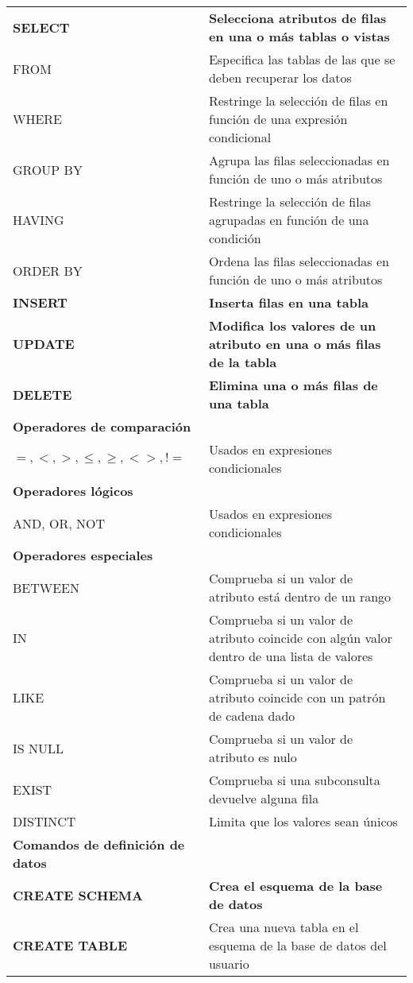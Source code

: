\begin{longtable}[l]{ l p{7cm} }
    \textbf{SELECT} & \textbf{Selecciona atributos de filas en una o más tablas o vistas}\\
    \qquad FROM  & Especifica las tablas de las que se deben recuperar los datos\\
    \qquad WHERE  & Restringe la selección de filas en función de una expresión condicional\\
    \qquad GROUP BY & Agrupa las filas seleccionadas en función de uno o más atributos\\
    \qquad HAVING & Restringe la selección de filas agrupadas en función de una condición\\
    \qquad ORDER BY & Ordena las filas seleccionadas en función de uno o más atributos\\
     \textbf{INSERT} & \textbf{Inserta filas en una tabla}\\
     \textbf{UPDATE} & \textbf{Modifica los valores de un atributo en una o más filas de la tabla}\\
    \textbf{DELETE} & \textbf{Elimina una o más filas de una tabla}\\
    \textbf{Operadores de comparación} \\
    \qquad $=,<,>,\leq,\geq,<>,!=$ & Usados en expresiones condicionales\\
    \textbf{Operadores lógicos} \\
    \qquad AND, OR, NOT & Usados en expresiones condicionales\\
    \textbf{Operadores especiales} \\
    \qquad BETWEEN & Comprueba si un valor de atributo está dentro de un rango\\
    \qquad IN & Comprueba si un valor de atributo coincide con algún valor dentro de una lista de valores\\
    \qquad LIKE & Comprueba si un valor de atributo coincide con un patrón de cadena dado\\
    \qquad IS NULL & Comprueba si un valor de atributo es nulo\\
    \qquad EXIST & Comprueba si una subconsulta devuelve alguna fila\\
    \qquad DISTINCT & Limita que los valores sean únicos\\
    \textbf{Comandos de definición de datos}\\
    \textbf{CREATE SCHEMA} & \textbf{Crea el esquema de la base de datos}\\
    \textbf{CREATE TABLE} & Crea una nueva tabla en el esquema de la base de datos del usuario\\

\end{longtable}
